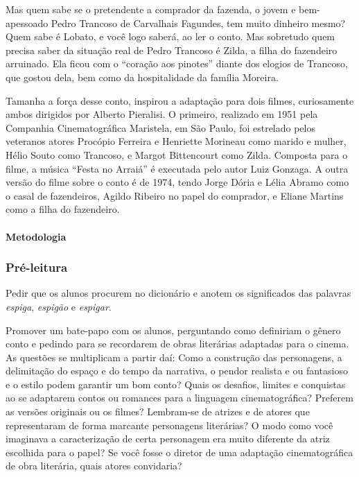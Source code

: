 \documentclass[11pt]{extarticle}
\begin{document}
Mas quem sabe se o pretendente a comprador da fazenda, o jovem e
bem-apessoado Pedro Trancoso de Carvalhais Fagundes, tem muito dinheiro
mesmo? Quem sabe é Lobato, e você logo saberá, ao ler o conto. Mas
sobretudo quem precisa saber da situação real de Pedro Trancoso é Zilda,
a filha do fazendeiro arruinado. Ela ficou com o ``coração aos pinotes''
diante dos elogios de Trancoso, que gostou dela, bem como da
hospitalidade da família Moreira.

Tamanha a força desse conto, inspirou a adaptação para dois filmes,
curiosamente ambos dirigidos por Alberto Pieralisi. O primeiro,
realizado em 1951 pela Companhia Cinematográfica Maristela, em São
Paulo, foi estrelado pelos veteranos atores Procópio Ferreira e
Henriette Morineau como marido e mulher, Hélio Souto como Trancoso, e
Margot Bittencourt como Zilda. Composta para o filme, a música ``Festa
no Arraiá'' é executada pelo autor Luiz Gonzaga. A outra versão do filme
sobre o conto é de 1974, tendo Jorge Dória e Lélia Abramo como o casal
de fazendeiros, Agildo Ribeiro no papel do comprador, e Eliane Martins
como a filha do fazendeiro.

\paragraph{Metodologia}

\subsubsection{Pré-leitura}

Pedir que os alunos procurem no dicionário e anotem os significados das
palavras \emph{espiga}, \emph{espigão} e \emph{espigar}.

Promover um bate-papo com os alunos, perguntando como definiriam o
gênero conto e pedindo para se recordarem de obras literárias adaptadas
para o cinema. As questões se multiplicam a partir daí: Como a
construção das personagens, a delimitação do espaço e do tempo da
narrativa, o pendor realista e ou fantasioso e o estilo podem garantir
um bom conto? Quais os desafios, limites e conquistas ao se adaptarem
contos ou romances para a linguagem cinematográfica? Preferem as versões
originais ou os filmes? Lembram-se de atrizes e de atores que
representaram de forma marcante personagens literárias? O modo como você
imaginava a caracterização de certa personagem era muito diferente da
atriz escolhida para o papel? Se você fosse o diretor de uma adaptação
cinematográfica de obra literária, quais atores convidaria?
\end{document}
